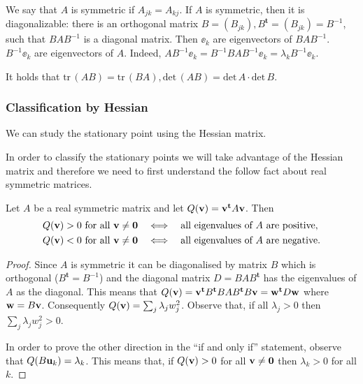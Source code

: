 We say that $A$ is symmetric if $A_{jk} = A_{kj}$. If $A$ is symmetric, then it is diagonalizable:
there is an orthogonal matrix $B = (B_{jk}), B^{\mathbf{t}} = (B_{jk}) = B^{-1}$, such that
$BAB^{-1}$ is a diagonal matrix. Then $\ee_k$ are eigenvectors of $BAB^{-1}$.
$B^{-1}\ee_k$ are eigenvectors of $A$. Indeed, $AB^{-1}\ee_k = B^{-1}BAB^{-1}\ee_k = \lambda_k B^{-1}\ee_k$.

It holds that $\mathrm{tr\,}(AB) = \mathrm{tr\,}(BA), \mathrm{det\,}(AB) = \mathrm{det\,}A \cdot \mathrm{det\,}B$.

\subsubsection*{Classification by Hessian}

We can study the stationary point using the Hessian matrix.

In order to classify the stationary points we will take advantage of the Hessian matrix and therefore we need to first understand the follow fact about real symmetric matrices.

\begin{theorem}
    Let \(A\) be a real symmetric matrix and let
    \(Q(\mathbf{v}) =  \mathbf{v}^{\mathbf{t}} A  \mathbf{v}  \).
    Then
    \[
        \begin{aligned}
            \text{\(Q(\mathbf{v}) > 0\) for all \(\mathbf{v}\neq \mathbf{0}\)}
             & \quad \Longleftrightarrow \quad
            \text{all eigenvalues of \(A\) are positive}, \\
            \text{\(Q(\mathbf{v}) < 0\) for all \(\mathbf{v}\neq \mathbf{0}\)}
             & \quad \Longleftrightarrow \quad
            \text{all eigenvalues of \(A\) are negative}.
        \end{aligned}
    \]
\end{theorem}

\begin{proof}
    Since \(A\) is symmetric it can be diagonalised by  matrix \(B\)  which is orthogonal (\(B^{\mathbf{t}}=B^{-1}\))
    and the diagonal matrix \(D = B A B^{\mathbf{t}}\) has the eigenvalues of \(A\) as the diagonal.
    This means that
    \(Q(\mathbf{v}) = \mathbf{v}^{\mathbf{t}} B^{\mathbf{t}} B A B^{\mathbf{t}} B \mathbf{v} = \mathbf{w}^{\mathbf{t}} D \mathbf{w} \)
    where \(\mathbf{w} = B \mathbf{v}\).
    Consequently \(Q(\mathbf{v}) =  \sum_{j} \lambda_j w_j^2\).
    Observe that, if all \(\lambda_j >0\) then \( \sum_{j} \lambda_j w_j^2  >0\).

    In order to prove the other direction in the ``if and only if'' statement, observe that \(Q(B \mathbf{u}_k ) = \lambda_k\). This means that, if \(Q(\mathbf{v}) > 0\) for all \(\mathbf{v} \neq \mathbf{0}\) then \(\lambda_k>0\) for all \(k\).
\end{proof}

